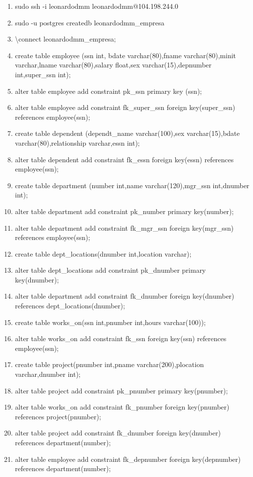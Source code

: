 \documentclass[10pt]{article}         %
\begin{document}
\begin{enumerate}

\item
sudo ssh -i leonardodmm leonardodmm@104.198.244.0
\item
sudo -u postgres createdb leonardodmm\_empresa
\item
\textbackslash connect leonardodmm\_empresa;
\item
create table employee (ssn int, bdate varchar(80),fname varchar(80),minit varchar,lname varchar(80),salary float,sex varchar(15),depnumber int,super\_ssn int);
\item
alter table employee  add constraint pk\_ssn primary key (ssn);
\item
alter table employee  add constraint fk\_super\_ssn foreign key(super\_ssn) references employee(ssn);
\item
create table dependent (dependt\_name varchar(100),sex varchar(15),bdate varchar(80),relationship varchar,essn int);
\item
alter table dependent add constraint fk\_essn foreign key(essn) references employee(ssn);
\item
create table department (number int,name varchar(120),mgr\_ssn int,dnumber int);
\item
alter table department add constraint pk\_number primary key(number);
\item
alter table department add constraint fk\_mgr\_ssn foreign key(mgr\_ssn) references employee(ssn);
\item
create table dept\_locations(dnumber int,location varchar);
\item
alter table dept\_locations add constraint pk\_dnumber primary key(dnumber);
\item
alter table department add constraint fk\_dnumber foreign key(dnumber) references dept\_locations(dnumber);
\item
 create table works\_on(ssn int,pnumber int,hours varchar(100));
\item
alter table works\_on add constraint fk\_ssn foreign key(ssn) references employee(ssn);
\item
create table project(pnumber int,pname varchar(200),plocation varchar,dnumber int);
\item
alter table project add constraint pk\_pnumber primary key(pnumber);
\item
alter table works\_on add constraint fk\_pnumber foreign key(pnumber) references project(pnumber);
\item
alter table project add constraint fk\_dnumber foreign key(dnumber) references department(number);
\item
alter table employee add constraint fk\_depnumber foreign key(depnumber) references department(number);




\end{enumerate}
\end{document}
